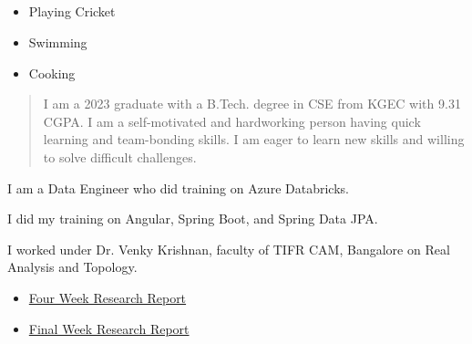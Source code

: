 \documentclass[10pt,legalpaper,ragged2e,withhyper]{debjitpalcv}
\newenvironment{sloppypar*}{\sloppy\ignorespaces}{\par}
\begin{document}
\begin{paracol}{2}
    \\
    \\
    \\
    \\


    \begin{sloppypar*}
        \begin{itemize}
            \item Playing Cricket
            \item Swimming
            \item Cooking
        \end{itemize}
    \end{sloppypar*}

    \newpage
    \switchcolumn

    \begin{quote}

        I am a 2023 graduate with a B.Tech. degree in CSE from KGEC with 9.31 CGPA. I am a self-motivated and hardworking person having quick learning and team-bonding skills. I am eager to learn new skills and willing to solve difficult challenges.

    \end{quote}

    I am a Data Engineer who did training on Azure Databricks.
    \divider
    
    I did my training on Angular, Spring Boot, and Spring Data JPA. 
    \divider

    I worked under Dr. Venky Krishnan, faculty of TIFR CAM, Bangalore on Real Analysis and Topology. \\
    \begin{itemize}
        \item \href{https://www.academia.edu/94639467/Four_Week_Research_Report_of_IASC_INSA_NASI_Summer_Research_Fellowship?source=swp_share}{Four Week Research Report}
        \item \href{https://www.academia.edu/94640080/Final_Week_Research_Report_of_IASC_INSA_NASI_Summer_Research_Fellowship?source=swp_share}{Final Week Research Report}
    \end{itemize}


\end{paracol}
\end{document}
